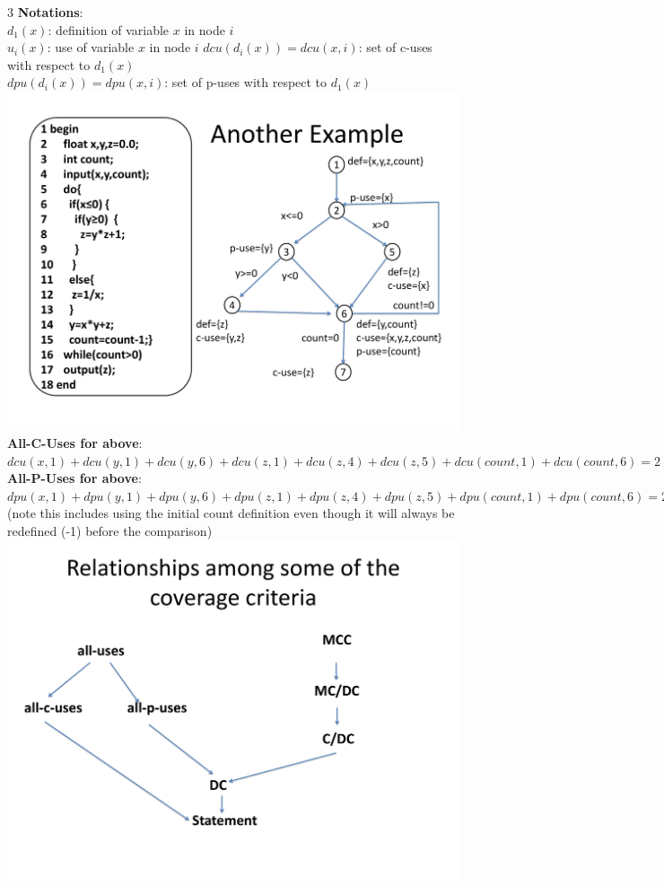 \documentclass[a4paper]{article}
\begin{document}
\begin{multicols}{3}
        \textbf{Notations}:\\
        $d_1(x)$: definition of variable $x$ in node $i$\\
        $u_i(x)$: use of variable $x$ in node $i$
        $dcu(d_i(x)) = dcu(x,i)$: set of c-uses with respect to $d_1(x)$\\
        $dpu(d_i(x)) = dpu(x,i)$: set of p-uses with respect to $d_1(x)$\\
        \includegraphics[width=\linewidth]{196.pdf}\\
        \textbf{All-C-Uses for above}: $dcu(x,1) + dcu(y,1) + dcu(y,6) + dcu(z,1) + dcu(z,4) + dcu(z,5) + dcu(count,1) + dcu(count,6) = 2 + 2 + 2 + 3 + 3 + 3 + 1 + 1 = 17$\\
        \textbf{All-P-Uses for above}: $dpu(x,1) + dpu(y,1) + dpu(y,6) + dpu(z,1) + dpu(z,4) + dpu(z,5) + dpu(count,1) + dpu(count,6) = 2 + 2 + 2 + 0 + 0 + 0 + 2 + 2 = 10$ (note this includes using the initial count definition even though it will always be redefined (-1) before the comparison)\\
        \includegraphics[width=\linewidth]{203.pdf}\\

\end{multicols}
\end{document}
